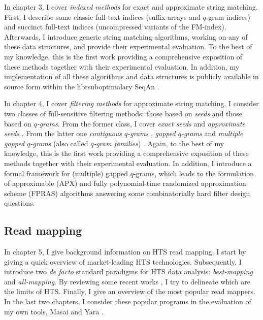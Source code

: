 In chapter 3, I cover \emph{indexed methods} for exact and approximate string matching.
First, I describe some classic full-text indices (suffix arrays and $q$-gram indices) and succinct full-text indices (uncompressed variants of the FM-index).
Afterwards, I introduce generic string matching algorithms, working on any of these data structures, and provide their experimental evaluation.
To the best of my knowledge, this is the first work providing a comprehensive exposition of these methods together with their experimental evaluation.
In addition, my implementation of all these algorithms and data structures is publicly available in source form within the \CC librsuboptimalary SeqAn \citep{Doering2008}.

In chapter 4, I cover \emph{filtering methods} for approximate string matching.
I consider two classes of full-sensitive filtering methods: those based on \emph{seeds} and those based on \emph{$q$-grams}.
From the former class, I cover
\emph{exact seeds} \citep{Baeza1992} and
\emph{approximate seeds} \citep{Myers1994,Navarro2000}.
From the latter one
\emph{contiguous $q$-grams} \citep{Jokinen1991},
\emph{gapped $q$-grams} \citep{Burkhardt2001} and
\emph{multiple gapped $q$-grams} (also called \emph{$q$-gram families}) \citep{Kucherov2005}.
Again, to the best of my knowledge, this is the first work providing a comprehensive exposition of these methods together with their experimental evaluation.
In addition, I introduce a formal framework for (multiple) gapped $q$-grams, which leads to the formulation of approximable (APX) and fully polynomial-time randomized approximation scheme (FPRAS) algorithms answering some combinatorially hard filter design questions.

\subsection{Read mapping}

In chapter 5, I give background information on HTS read mapping.
I start by giving a quick overview of market-leading HTS technologies.
Subsequently, I introduce two \emph{de facto} standard paradigms for HTS data analysis: \emph{best-mapping} and \emph{all-mapping}.
By reviewing some recent works \citep{Derrien2012,Lee2012}, I try to delineate which are the limits of HTS.
Finally, I give an overview of the most popular read mappers.
In the last two chapters, I consider these popular programs in the evaluation of my own tools, Masai \citep{Siragusa2013} and Yara \citep{Siragusa2015}.


